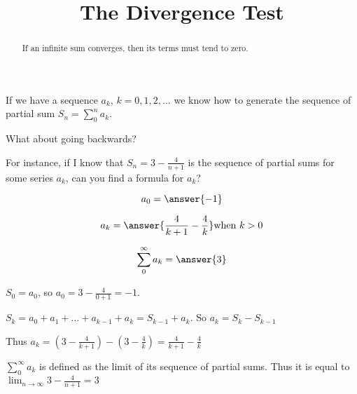 \documentclass{ximera}
\title[Dig-In:]{The Divergence Test}
\begin{document}
\begin{abstract}
If an infinite sum converges, then its terms must tend to zero.
\end{abstract}
\maketitle


\begin{question}
If we have a sequence $a_k$, $k=0,1,2, \dots $ we know how to generate the sequence of partial sum $S_n = \sum_0^n a_k$.

What about going backwards?

For instance, if I know that $S_n = 3-\frac{4}{n+1}$ is the sequence of partial sums for some series $a_k$, can you find a formula for $a_k$?

\[
a_0 = \answer{-1}
\]

\[
a_k = \answer{\frac{4}{k+1} - \frac{4}{k}} \text{when $k>0$}
\]

\[
\sum_0^\infty a_k = \answer{3}
\]


\begin{hint}
$S_0 = a_0$, so $a_0 = 3-\frac{4}{0+1} = -1$.
\end{hint}

\begin{hint}
$S_k = a_0+a_1+ \dots +a_{k-1}+a_k = S_{k-1}+a_k$.  So $a_k = S_k - S_{k-1}$
\end{hint}

\begin{hint}
Thus $a_k = (3-\frac{4}{k+1})  - (3-\frac{4}{k}) = \frac{4}{k+1} - \frac{4}{k}$
\end{hint}


\begin{hint}
 $\sum_0^\infty a_k $ is defined as the limit of its sequence of partial sums.  Thus it is equal to $\lim_{n \to \infty} 3-\frac{4}{n+1} = 3$
\end{hint}

\end{question}
\end{document}
